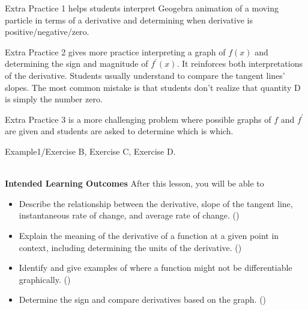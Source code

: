 \documentclass[10pt]{article}
\begin{document}
{ 
 \item Extra Practice 1 helps students interpret Geogebra animation of a moving particle in terms of a derivative and determining when derivative is positive/negative/zero.
 \item Extra Practice 2 gives more practice interpreting a graph of $f(x)$ and determining the sign and magnitude of $f^{\prime}(x)$. It reinforces both interpretations of the derivative. Students usually understand to compare the tangent lines' slopes. The most common mistake is that students don't realize that quantity D is simply the number zero.

 \item Extra Practice 3 is a more challenging problem where possible graphs of $f$ and $f^{\prime}$ are given and students are asked to determine which is which.
 }

\core Example1/Exercise B, Exercise C, Exercise D.


\newpage
\hrulefill\\
\textbf{Intended Learning Outcomes}
After this lesson, you will be able to 

\begin{itemize}
    \item Describe the relationship between the derivative, slope of the tangent line, instantaneous rate of change, and average rate of change. ()
    \item Explain the meaning of the derivative of a function at a given point in context, including determining the units of the derivative. ()
    \item Identify and give examples of where a function might not be differentiable graphically. ()
    \item Determine the sign and compare derivatives based on the graph. ()
\end{itemize}
\end{document}
